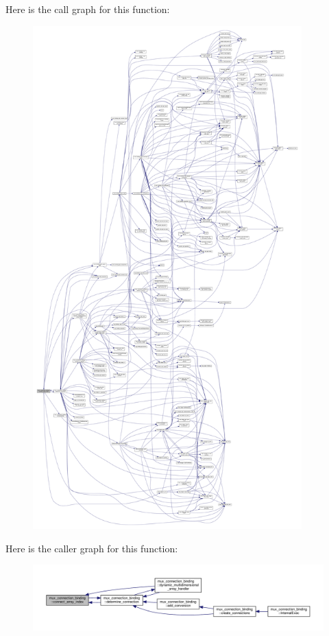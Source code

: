 Here is the call graph for this function\+:
\nopagebreak
\begin{figure}[H]
\begin{center}
\leavevmode
\includegraphics[height=550pt]{d7/d1e/classmux__connection__binding_ad251a8347349b835c134d933a8f02048_cgraph}
\end{center}
\end{figure}
Here is the caller graph for this function\+:
\nopagebreak
\begin{figure}[H]
\begin{center}
\leavevmode
\includegraphics[width=350pt]{d7/d1e/classmux__connection__binding_ad251a8347349b835c134d933a8f02048_icgraph}
\end{center}
\end{figure}
\mbox{\label{classmux__connection__binding_a19eaa5ec4596679c457c35b7aa4061ed}} 
